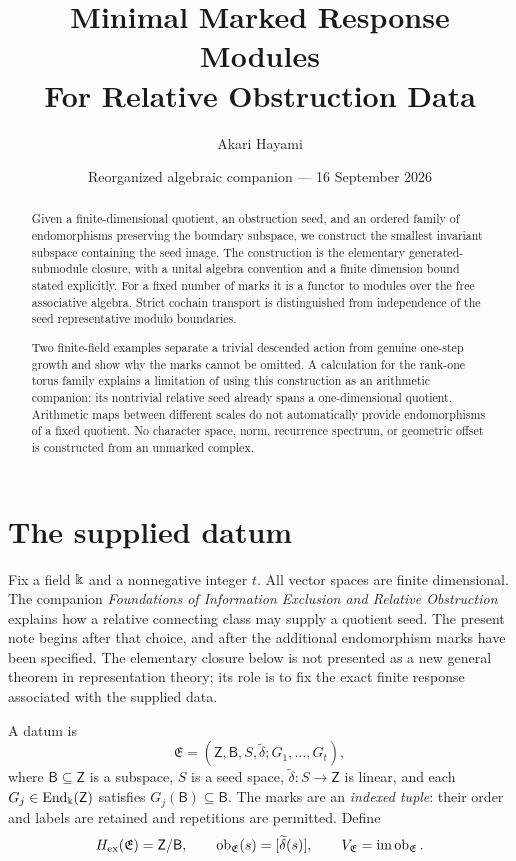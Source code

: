 \documentclass[11pt,a4paper]{article}
\title{\textbf{Minimal Marked Response Modules}\\
\large For Relative Obstruction Data}
\author{Akari Hayami}
\date{Reorganized algebraic companion --- 16 September 2026}
\begin{document}
\maketitle

\begin{abstract}
Given a finite-dimensional quotient, an obstruction seed, and an ordered
family of endomorphisms preserving the boundary subspace, we construct
the smallest invariant subspace containing the seed image.  The
construction is the elementary generated-submodule closure, with a unital
algebra convention and a finite dimension bound stated explicitly.
For a fixed number of marks it is a functor to modules over the free
associative algebra.  Strict cochain transport is distinguished from
independence of the seed representative modulo boundaries.

Two finite-field examples separate a trivial descended action from
genuine one-step growth and show why the marks cannot be omitted.  A
calculation for the rank-one torus family explains a limitation of using
this construction as an arithmetic companion: its nontrivial relative
seed already spans a one-dimensional quotient.  Arithmetic maps between
different scales do not automatically provide endomorphisms of a fixed
quotient.  No character space, norm, recurrence spectrum, or geometric
offset is constructed from an unmarked complex.
\end{abstract}

\section{The supplied datum}
\label{sec:datum}

Fix a field $\Bbbk$ and a nonnegative integer $t$.  All vector spaces are
finite dimensional.  The companion \emph{Foundations of Information
Exclusion and Relative Obstruction} explains how a relative connecting
class may supply a quotient seed.  The present note begins after that
choice, and after the additional endomorphism marks have been specified.
The elementary closure below is not presented as a new general theorem
in representation theory; its role is to fix the exact finite response
associated with the supplied data.

\begin{definition}\label{def:datum}
A datum is
\[
 \mathfrak E=(\mathsf Z,\mathsf B,S,\widetilde\delta;G_1,\ldots,G_t),
\]
where $\mathsf B\subseteq\mathsf Z$ is a subspace, $S$ is a seed space,
$\widetilde\delta:S\to\mathsf Z$ is linear, and each
$G_j\in\operatorname{End}_\Bbbk(\mathsf Z)$ satisfies $G_j(\mathsf B)\subseteq\mathsf B$.
The marks are an \emph{indexed tuple}: their order and labels are retained
and repetitions are permitted.  Define
\[
 H_{\mathrm{ex}}(\mathfrak E)=\mathsf Z/\mathsf B,
 \qquad \operatorname{ob}_{\mathfrak E}(s)=[\widetilde\delta(s)],
 \qquad V_{\mathfrak E}=\operatorname{im}\operatorname{ob}_{\mathfrak E}.
\]
\end{definition}
\end{document}
